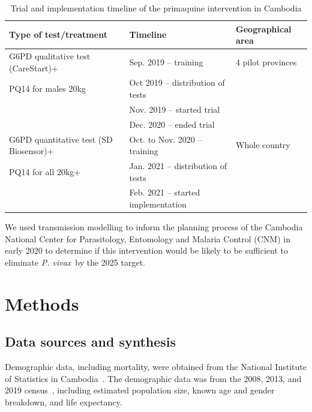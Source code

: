 \documentclass[doublespacing]{bmcart}
\newcommand{\pv}{\textit{P. vivax}}
\begin{document}
\begin{table}[]
    \centering
    \begin{tabular}{l l l}
    \hline
    Type of test/treatment & Timeline & Geographical area \\
    \hline
    G6PD qualitative test (CareStart)+ & Sep. 2019 -- training & 4 pilot provinces \\
    PQ14 for males 20kg  & Oct 2019 -- distribution of tests & \\
    & Nov. 2019 -- started trial & \\
    & Dec. 2020 -- ended trial & \\
    \hline
    G6PD quantitative test (SD Biosensor)+  & Oct. to Nov. 2020 -- training & Whole country \\
    PQ14 for all 20kg+ & Jan. 2021 -- distribution of tests & \\
    & Feb. 2021 -- started implementation & \\
    \hline
    
    \end{tabular}
    \caption{Trial and implementation timeline of the primaquine intervention in Cambodia}
    \label{tab:trialtimeline}
\end{table}



We used transmission modelling to inform the planning process of the Cambodia National Center for Parasitology, Entomology and Malaria Control (CNM) in early 2020 to determine if this intervention would be likely to be sufficient to eliminate \pv~by the 2025 target. 



%
\section*{Methods} \label{sec:methods} %

\subsection*{Data sources and synthesis} 
Demographic data, including mortality, were obtained from the National Institute of Statistics in Cambodia~\cite{NIS_Cambodia}. The demographic data was from the 2008, 2013, and 2019 census~\cite{NIS_Cambodia}, including estimated population size, known age and gender breakdown, and life expectancy.
\end{document}
